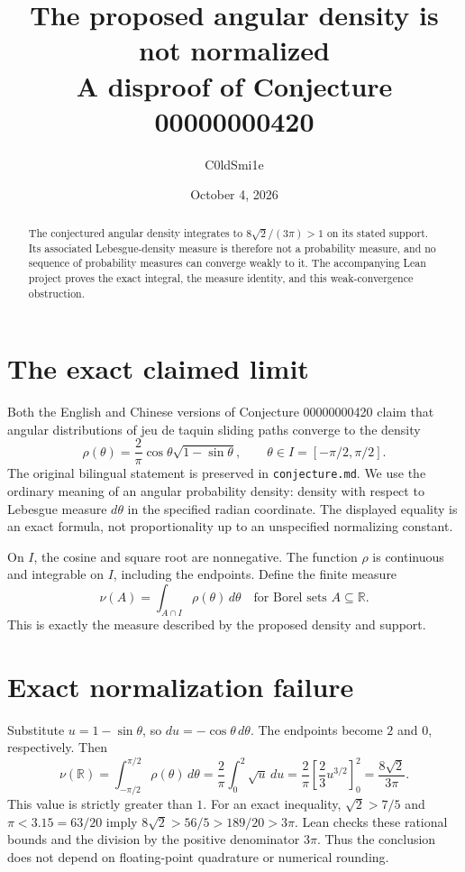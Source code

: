\documentclass[11pt]{article}
\title{The proposed angular density is not normalized\\A disproof of Conjecture 00000000420}
\author{C0ldSmi1e}
\date{October 4, 2026}
\newcommand{\R}{\mathbb R}
\begin{document}
\maketitle
\begin{abstract}
The conjectured angular density integrates to $8\sqrt2/(3\pi)>1$ on its stated support. Its associated Lebesgue-density measure is therefore not a probability measure, and no sequence of probability measures can converge weakly to it. The accompanying Lean project proves the exact integral, the measure identity, and this weak-convergence obstruction.
\end{abstract}

\section{The exact claimed limit}
Both the English and Chinese versions of Conjecture 00000000420 claim that angular distributions of jeu de taquin sliding paths converge to the density
\[
 \rho(\theta)=\frac2\pi\cos\theta\sqrt{1-\sin\theta},
 \qquad \theta\in I=[-\pi/2,\pi/2].
\]
The original bilingual statement is preserved in \texttt{conjecture.md}. We use the ordinary meaning of an angular probability density: density with respect to Lebesgue measure $d\theta$ in the specified radian coordinate. The displayed equality is an exact formula, not proportionality up to an unspecified normalizing constant.

On $I$, the cosine and square root are nonnegative. The function $\rho$ is continuous and integrable on $I$, including the endpoints. Define the finite measure
\[
 \nu(A)=\int_{A\cap I}\rho(\theta)\,d\theta
 \quad\text{for Borel sets }A\subseteq\R.
\]
This is exactly the measure described by the proposed density and support.

\section{Exact normalization failure}
Substitute $u=1-\sin\theta$, so $du=-\cos\theta\,d\theta$. The endpoints become $2$ and $0$, respectively. Then
\[
 \nu(\R)=\int_{-\pi/2}^{\pi/2}\rho(\theta)\,d\theta
 =\frac2\pi\int_0^2\sqrt u\,du
 =\frac2\pi\left[\frac23u^{3/2}\right]_0^2
 =\frac{8\sqrt2}{3\pi}.
\]
This value is strictly greater than $1$. For an exact inequality, $\sqrt2>7/5$ and $\pi<3.15=63/20$ imply $8\sqrt2>56/5>189/20>3\pi$. Lean checks these rational bounds and the division by the positive denominator $3\pi$. Thus the conclusion does not depend on floating-point quadrature or numerical rounding.
\newpage
\end{document}
